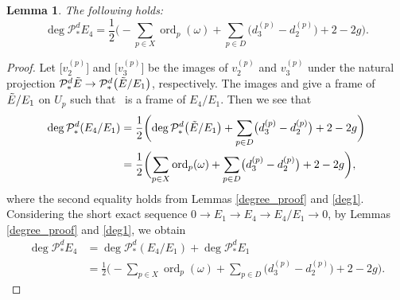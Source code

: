 \documentclass[10pt,a4paper]{amsart}
\numberwithin{equation}{section}
\newtheorem{Lemma}[Theorem]{Lemma}
\newcommand{\ord}{\operatorname{ord}}
\begin{document}
\begin{Lemma}\label{deg_E4}
 The following holds:
 \begin{equation*}
 \deg{\mathcal{P}^d_{*}E_4} = \frac{1}{2}\biggl(-\sum_{p\in X}\ord_p(\omega) + \sum_{p\in D} \bigl(d^{(p)}_3 - d^{(p)}_2\bigr) + 2-2g\biggr).
 \end{equation*}
\end{Lemma}
\begin{proof}
 Let $\bigl[v^{(p)}_2\bigr]$ and $\bigl[v^{(p)}_3\bigr]$ be the images of $v^{(p)}_2$ and $v^{(p)}_3$ under the natural projection $\mathcal{P}^d_{*}{\Tilde{E}}\to \mathcal{P}^d_{*}\bigl(\Tilde{E}/E_1\bigr)$, respectively. The images \smash{$\bigl[v^{(p)}_2\bigr]$}
 and \smash{$\bigl[v^{(p)}_3\bigr]$} give a frame of $\Tilde{E}/E_1$ on $U_p$ such that~\smash{$\bigl[v^{(p)}_2\bigr]$} is a frame of $E_4/E_1$. Then we see that
\begin{align*}
 \deg{\mathcal{P}^d_{*}(E_4/E_1)} &{}= \frac{1}{2}\biggl(\deg{\mathcal{P}^d_{*}\bigl(\Tilde{E}/E_1\bigr)} + \sum_{p\in D} \bigl(d^{(p)}_3 - d^{(p)}_2\bigr) + 2-2g\biggr)\\
 &{}= \frac{1}{2}\biggl(\sum_{p\in X}\ord_p(\omega) + \sum_{p\in D} \bigl(d^{(p)}_3 - d^{(p)}_2\bigr) + 2-2g\biggr),
 \end{align*}
where the second equality holds from Lemmas \ref{degree_proof} and \ref{deg1}.
Considering the short exact sequence $0\to E_1\to E_4\to E_4/E_1 \to 0$, by Lemmas \ref{degree_proof} and \ref{deg1}, we obtain
\begin{align*}
 \deg{\mathcal{P}^d_{*}E_4} &{}= \deg{\mathcal{P}^d_{*}(E_4/E_1)} + \deg{\mathcal{P}^d_{*}E_1} \\
 &{}= \frac{1}{2}\biggl(-\sum_{p\in X}\ord_p(\omega) + \sum_{p\in D} \bigl(d^{(p)}_3 - d^{(p)}_2\bigr) + 2-2g\biggr).
\tag*{\qed}
\end{align*}
\renewcommand{\qed}{}
\end{proof}
\end{document}
